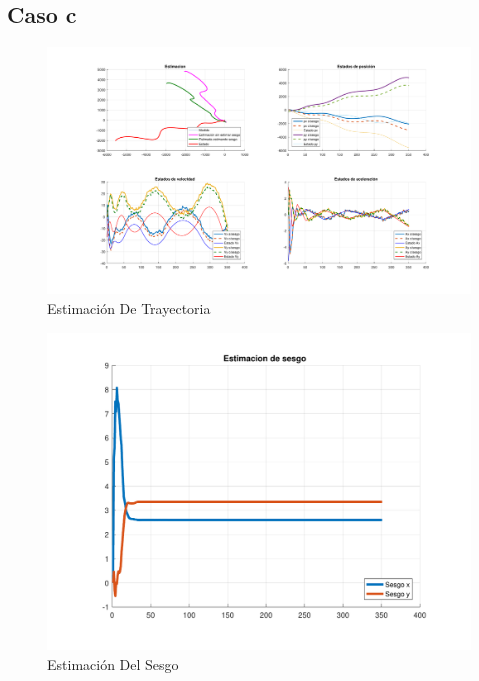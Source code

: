 \subsection{Caso c}

	\begin{figure}[H]
		\centering
		\includegraphics[width=1.0\textwidth,keepaspectratio]{Figuras/graf_ej4c.pdf}
		\caption{Estimación De Trayectoria}
		\label{fig:ej4c}
	\end{figure}
	
	\begin{figure}[H]
		\centering
		\includegraphics[width=1.0\textwidth,keepaspectratio]{Figuras/bias_ej4c.pdf}
		\caption{Estimación Del Sesgo}
		\label{fig:ej4c_bias}
	\end{figure}
	
